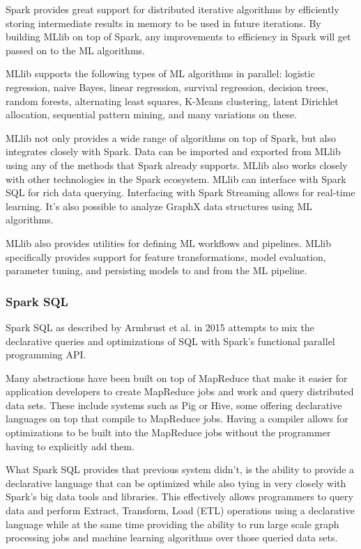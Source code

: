 \documentclass[]{article}
\begin{document}
Spark provides great support for distributed iterative algorithms by efficiently storing intermediate results in memory to be used in future iterations. By building MLlib on top of Spark, any improvements to efficiency in Spark will get passed on to the ML algorithms.

MLlib supports the following types of ML algorithms in parallel: logistic regression, naive Bayes, linear regression, survival regression, decision trees, random forests, alternating least squares, K-Means clustering, latent Dirichlet allocation, sequential pattern mining, and many variations on these.

MLlib not only provides a wide range of algorithms on top of Spark, but also integrates closely with Spark. Data can be imported and exported from MLlib using any of the methods that Spark already supports. MLlib also works closely with other technologies in the Spark ecosystem. MLlib can interface with Spark SQL for rich data querying. Interfacing with Spark Streaming allows for real-time learning. It's also possible to analyze GraphX data structures using ML algorithms.

MLlib also provides utilities for defining ML workflows and pipelines. MLlib specifically provides support for feature transformations, model evaluation, parameter tuning, and persisting models to and from the ML pipeline.

\subsubsection{Spark SQL}\label{sssec:spark-sql}
Spark SQL as described by Armbrust et al.\cite{armbrust2015spark} in 2015 attempts to mix the declarative queries and optimizations of SQL with Spark's functional parallel programming API.

Many abstractions have been built on top of MapReduce that make it easier for application developers to create MapReduce jobs and work and query distributed data sets. These include systems such as Pig or Hive, some offering declarative languages on top that compile to MapReduce jobs. Having a compiler allows for optimizations to be built into the MapReduce jobs without the programmer having to explicitly add them.

What Spark SQL provides that previous system didn't, is the ability to provide a declarative language that can be optimized while also tying in very closely with Spark's big data tools and libraries. This effectively allows programmers to query data and perform Extract, Transform, Load (ETL) operations using a declarative language while at the same time providing the ability to run large scale graph processing jobs and machine learning algorithms over those queried data sets. 
\end{document}
